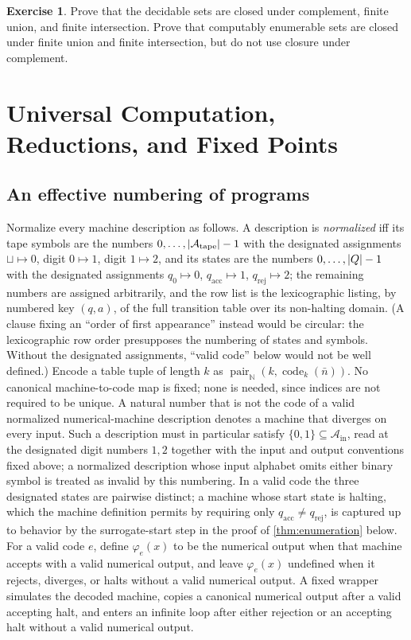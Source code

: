 \documentclass[11pt,oneside,openany]{book}
\theoremstyle{definition}
\newtheorem{exercise}[definition]{Exercise}
\theoremstyle{plain}
\theoremstyle{remark}
\DeclarePairedDelimiter{\abs}{\lvert}{\rvert}
\newcommand{\N}{\mathbb{N}}
\begin{document}
\begin{exercise}
\label{ex:turing-machines-01}
Prove that the decidable sets are closed under complement, finite union, and
finite intersection.  Prove that computably enumerable sets are closed under
finite union and finite intersection, but do not use closure under complement.
\end{exercise}

\chapter{Universal Computation, Reductions, and Fixed Points}
\label{ch:universal-reductions}

\section{An effective numbering of programs}
\label{sec:universal-reductions-01}

Normalize every machine description as follows.  A description is
\emph{normalized} iff its tape symbols are the numbers
\(0,\ldots,\abs{\mathcal A_{\mathrm{tape}}}-1\) with the designated
assignments \(\sqcup\mapsto0\), digit \(0\mapsto1\), digit \(1\mapsto2\),
and its states are the numbers \(0,\ldots,\abs{Q}-1\) with the designated
assignments \(q_0\mapsto0\), \(q_{\mathrm{acc}}\mapsto1\),
\(q_{\mathrm{rej}}\mapsto2\); the remaining numbers are assigned
arbitrarily, and the row list is the lexicographic listing, by numbered key
\((q,a)\), of the full transition table over its non-halting domain.  (A
clause fixing an ``order of first appearance'' instead would be circular:
the lexicographic row order presupposes the numbering of states and
symbols.  Without the designated assignments, ``valid code'' below would
not be well defined.)  Encode a table tuple of length \(k\) as
\(\operatorname{pair}_{\N}(k,\operatorname{code}_k(\bar n))\).  No
canonical machine-to-code map is fixed; none is needed, since indices are
not required to be unique.  A natural number that is not the code of a
valid normalized numerical-machine description denotes a machine that
diverges on every input.  Such a description must in particular satisfy
\(\{0,1\}\subseteq\mathcal A_{\mathrm{in}}\), read at the designated digit
numbers \(1,2\) together with the input and output conventions fixed
above; a normalized description whose input alphabet omits either binary
symbol is treated as invalid by this numbering.  In a valid code the three
designated states are pairwise distinct; a machine whose start state is
halting, which the machine definition permits by requiring only
\(q_{\mathrm{acc}}\neq q_{\mathrm{rej}}\), is captured up to behavior by
the surrogate-start step in the proof of \cref{thm:enumeration} below.
For a valid code \(e\), define
\(\varphi_e(x)\) to be the numerical output when that machine accepts with a
valid numerical output, and leave \(\varphi_e(x)\) undefined when it rejects,
diverges, or halts without a valid numerical output.  A fixed wrapper simulates the decoded
machine, copies a canonical numerical output after a valid accepting halt, and
enters an infinite loop after either rejection or an accepting halt without a
valid numerical output.
\end{document}
